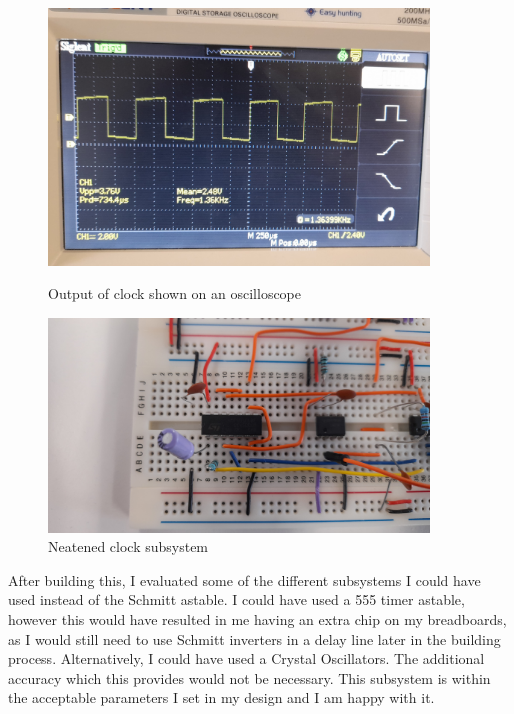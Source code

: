 \begin{figure}[H]
    \centering
    \begin{minipage}[t]{0.45\textwidth}
        \centering
        \includegraphics[width=0.9\textwidth]{images/clockOscZoomed.jpg}
        \caption{Output of clock shown on an oscilloscope}
        \label{fig:clockOsc}
    \end{minipage}\hfill
    \begin{minipage}[t]{0.45\textwidth}
        \centering
        \includegraphics[width=0.9\textwidth]{images/clockNeatened.jpg}
        \caption{Neatened clock subsystem}
         \label{fig:clockNeatWires}
    \end{minipage}
\end{figure}

\noindent After building this, I evaluated some of the different subsystems I could have used instead of the Schmitt astable. I could have used a 555 timer astable, however this would have resulted in me having an extra chip on my breadboards, as I would still need to use Schmitt inverters in a delay line later in the building process. Alternatively, I could have used a Crystal Oscillators. The additional accuracy which this provides would not be necessary. \newline
This subsystem is within the acceptable parameters I set in my design and I am happy with it.

